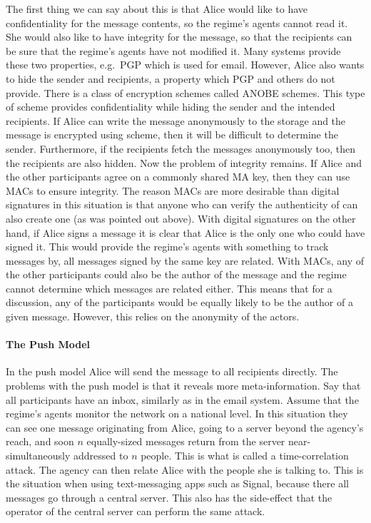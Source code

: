 The first thing we can say about this is that Alice would like to have 
confidentiality for the message contents, so the regime's agents cannot read 
it.
She would also like to have integrity for the message, so that the recipients 
can be sure that the regime's agents have not modified it.
Many systems provide these two properties, e.g.\ \ac{PGP} which is used for 
email.
However, Alice also wants to hide the sender and recipients, a property which 
\ac{PGP} and others do not provide.
There is a class of encryption schemes called \ac{ANOBE} schemes.
This type of scheme provides confidentiality while hiding the sender and the 
intended recipients.
If Alice can write the message anonymously to the storage and the message is 
encrypted using  scheme, then it will be difficult to determine the 
sender.
Furthermore, if the recipients fetch the messages anonymously too, then the 
recipients are also hidden.
Now the problem of integrity remains.
If Alice and the other participants agree on a commonly shared \ac{MA} key, 
then they can use \acp{MAC} to ensure integrity.
The reason \acp{MAC} are more desirable than digital signatures in this 
situation is that anyone who can verify the authenticity of  can also 
create one (as was pointed out above).
With digital signatures on the other hand, if Alice signs a message it is clear 
that Alice is the only one who could have signed it.
This would provide the regime's agents with something to track messages by, all 
messages signed by the same key are related.
With \acp{MAC}, any of the other participants could also be the author of the 
message and the regime cannot determine which messages are related either.
This means that for a discussion, any of the participants would be equally 
likely to be the author of a given message.
However, this relies on the anonymity of the actors.

\paragraph{The Push Model}

In the push model Alice will send the message to all recipients directly.
The problems with the push model is that it reveals more meta-information.
Say that all participants have an inbox, similarly as in the email system.
Assume that the regime's agents monitor the network on a national level.
In this situation they can see one message originating from Alice, going to 
a server beyond the agency's reach, and soon \(n\) equally-sized messages 
return from the server near-simultaneously addressed to \(n\) people.
This is what is called a time-correlation attack.
The agency can then relate Alice with the people she is talking to.
This is the situation when using text-messaging apps such as Signal, because 
there all messages go through a central server.
This also has the side-effect that the operator of the central server can 
perform the same attack.

